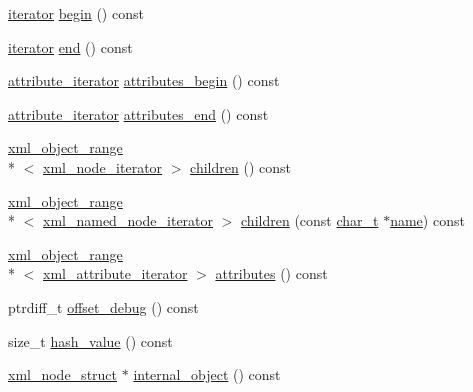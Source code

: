 \begin{DoxyCompactItemize}
\item 
\hyperlink{classpugi_1_1xml__node_ae053ea39add5a64de584f7a81212e388}{iterator} \hyperlink{classpugi_1_1xml__node_af1cfcc7ccae47095cd781a3c9c9b06e4}{begin} () const 
\item 
\hyperlink{classpugi_1_1xml__node_ae053ea39add5a64de584f7a81212e388}{iterator} \hyperlink{classpugi_1_1xml__node_a6e5b29519d6a1f08aa936d96624e095a}{end} () const 
\item 
\hyperlink{classpugi_1_1xml__node_a9084f97350ffc64af1eaf7c17c57f4ba}{attribute\-\_\-iterator} \hyperlink{classpugi_1_1xml__node_a1b4ab605d879cf5623e20505500b836e}{attributes\-\_\-begin} () const 
\item 
\hyperlink{classpugi_1_1xml__node_a9084f97350ffc64af1eaf7c17c57f4ba}{attribute\-\_\-iterator} \hyperlink{classpugi_1_1xml__node_a528b9274b0adeeda5ed12567057bee17}{attributes\-\_\-end} () const 
\item 
\hyperlink{classpugi_1_1xml__object__range}{xml\-\_\-object\-\_\-range}\\*
$<$ \hyperlink{classpugi_1_1xml__node__iterator}{xml\-\_\-node\-\_\-iterator} $>$ \hyperlink{classpugi_1_1xml__node_a267ab4724e63940e5a50234fc52bc855}{children} () const 
\item 
\hyperlink{classpugi_1_1xml__object__range}{xml\-\_\-object\-\_\-range}\\*
$<$ \hyperlink{classpugi_1_1xml__named__node__iterator}{xml\-\_\-named\-\_\-node\-\_\-iterator} $>$ \hyperlink{classpugi_1_1xml__node_afa490049463cabe6c5b5d774d85e5569}{children} (const \hyperlink{namespacepugi_aef5a7a62cba0507542220ea15afe39df}{char\-\_\-t} $\ast$\hyperlink{classpugi_1_1xml__node_ac765caace42ecf252d90aea81e09df57}{name}) const 
\item 
\hyperlink{classpugi_1_1xml__object__range}{xml\-\_\-object\-\_\-range}\\*
$<$ \hyperlink{classpugi_1_1xml__attribute__iterator}{xml\-\_\-attribute\-\_\-iterator} $>$ \hyperlink{classpugi_1_1xml__node_a35f616e0f529ec690b06ff0760d3f969}{attributes} () const 
\item 
ptrdiff\-\_\-t \hyperlink{classpugi_1_1xml__node_a77b819bd87978bebefe75d421a793cf3}{offset\-\_\-debug} () const 
\item 
size\-\_\-t \hyperlink{classpugi_1_1xml__node_a5abfc3ec37d1dd9cd0aee6a46d6cf88d}{hash\-\_\-value} () const 
\item 
\hyperlink{structpugi_1_1xml__node__struct}{xml\-\_\-node\-\_\-struct} $\ast$ \hyperlink{classpugi_1_1xml__node_a73e846c7ca8f6961a88150010c362ec6}{internal\-\_\-object} () const 
\end{DoxyCompactItemize}
